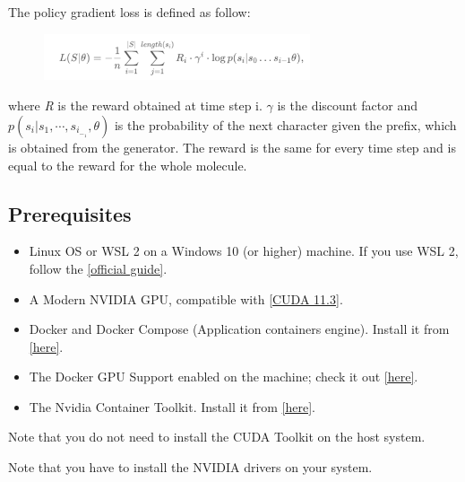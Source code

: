 \documentclass[a4paper]{article}
\begin{document}
The policy gradient loss is defined as follow:

\begin{figure}[htbp]
    \centering
        \includegraphics[width=0.70\textwidth]{formula.png}
    \label{fig:formula}
\end{figure}

where \textit{R} is the reward obtained at time step i. \begin{math}\gamma\end{math} is the discount factor and \begin{math} p(s_i | s_1,\cdots ,s_i_-_1,\theta) \end{math} is the probability of the next character given the prefix, which is obtained from the generator. The reward is the same for every time step and is equal to the reward for the whole molecule. 

\subsection{Prerequisites}\label{sec:Prerequisites}

\begin{itemize}
	\item Linux OS or WSL 2 on a Windows 10 (or higher) machine. If you use WSL 2, follow the \href{https://docs.nvidia.com/cuda/wsl-user-guide/index.html#getting-started-with-cuda-on-wsl}{[official guide]}.
	\item A Modern NVIDIA GPU, compatible with \href{https://developer.nvidia.com/cuda-11.3.0-download-archive}{[CUDA 11.3]}.
	\item Docker and Docker Compose (Application containers engine). Install it from \href{https://www.docker.com}{[here]}.
	\item The Docker GPU Support enabled on the machine; check it out \href{https://docs.docker.com/compose/gpu-support/}{[here]}.
	\item The Nvidia Container Toolkit. Install it from \href{https://docs.nvidia.com/datacenter/cloud-native/container-toolkit/install-guide.html#install-guide}{[here]}.
\end{itemize}

\begin{flushleft}
Note that you do not need to install the CUDA Toolkit on the host system.

Note that you have to install the NVIDIA drivers on your system.
\end{flushleft}
\end{document}
